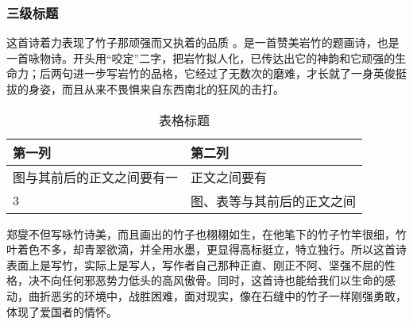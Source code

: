 \subsubsection{三级标题}
这首诗着力表现了竹子那顽强而又执着的品质 。是一首赞美岩竹的题画诗，也是一首咏物诗。开头用“咬定”二字，把岩竹拟人化，已传达出它的神韵和它顽强的生命力；后两句进一步写岩竹的品格，它经过了无数次的磨难，才长就了一身英俊挺拔的身姿，而且从来不畏惧来自东西南北的狂风的击打。
\begin{table}[!h]
    \centering
    \caption{表格标题}
    \label{tab:exp2}
    \tabfont %
    \begin{tabularx}{\textwidth}{XX}
        \toprule
        第一列                     & 第二列                     \\
        \midrule
        图与其前后的正文之间要有一 & 正文之间要有               \\
        3                          & 图、表等与其前后的正文之间 \\
        \bottomrule
    \end{tabularx}
\end{table}
郑燮不但写咏竹诗美，而且画出的竹子也栩栩如生，在他笔下的竹子竹竿很细，竹叶着色不多，却青翠欲滴，并全用水墨，更显得高标挺立，特立独行。所以这首诗表面上是写竹，实际上是写人，写作者自己那种正直、刚正不阿、坚强不屈的性格，决不向任何邪恶势力低头的高风傲骨。同时，这首诗也能给我们以生命的感动，曲折恶劣的环境中，战胜困难，面对现实，像在石缝中的竹子一样刚强勇敢，体现了爱国者的情怀。